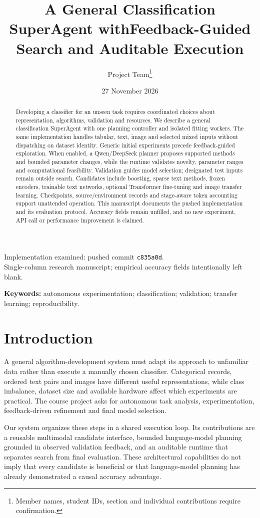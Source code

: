 \documentclass[11pt,a4paper]{article}
\title{\textbf{A General Classification SuperAgent with\newline Feedback-Guided Search and Auditable Execution}}
\author{Project Team\thanks{Member names, student IDs, section and individual contributions require confirmation.}}
\date{27 November 2026}
\newcommand{\code}[1]{\texttt{\small #1}}
\begin{document}
\maketitle
\begin{center}\small Implementation examined: pushed commit \code{c835a0d}.\\Single-column research manuscript; empirical accuracy fields intentionally left blank.\end{center}
\begin{abstract}
Developing a classifier for an unseen task requires coordinated choices about representation, algorithms, validation and resources. We describe a general classification SuperAgent with one planning controller and isolated fitting workers. The same implementation handles tabular, text, image and selected mixed inputs without dispatching on dataset identity. Generic initial experiments precede feedback-guided exploration. When enabled, a Qwen/DeepSeek planner proposes supported methods and bounded parameter changes, while the runtime validates novelty, parameter ranges and computational feasibility. Validation guides model selection; designated test inputs remain outside search. Candidates include boosting, sparse text methods, frozen encoders, trainable text networks, optional Transformer fine-tuning and image transfer learning. Checkpoints, source/environment records and stage-aware token accounting support unattended operation. This manuscript documents the pushed implementation and its evaluation protocol. Accuracy fields remain unfilled, and no new experiment, API call or performance improvement is claimed.
\end{abstract}
\noindent\textbf{Keywords:} autonomous experimentation; classification; validation; transfer learning; reproducibility.

\section{Introduction}
A general algorithm-development system must adapt its approach to unfamiliar data rather than execute a manually chosen classifier. Categorical records, ordered text pairs and images have different useful representations, while class imbalance, dataset size and available hardware affect which experiments are practical. The course project asks for autonomous task analysis, experimentation, feedback-driven refinement and final model selection.

Our system organizes these steps in a shared execution loop. Its contributions are a reusable multimodal candidate interface, bounded language-model planning grounded in observed validation feedback, and an auditable runtime that separates search from final evaluation. These architectural capabilities do not imply that every candidate is beneficial or that language-model planning has already demonstrated a causal accuracy advantage.
\end{document}

